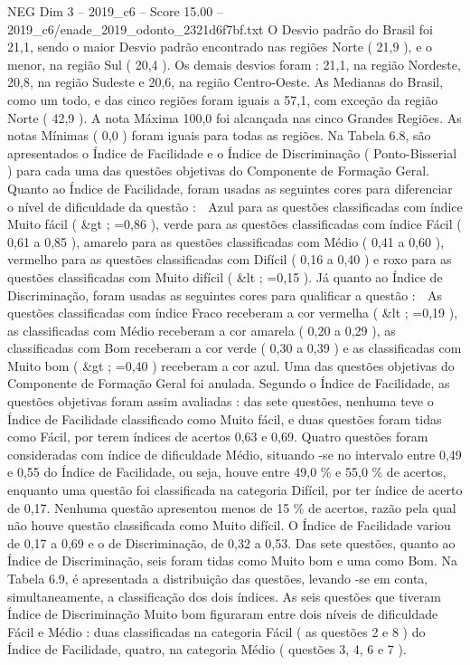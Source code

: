 \begin{textsample}{NEG Dim 3 – 2019\_c6 – Score 15.00 – 2019\_c6/enade\_2019\_odonto\_2321d6f7bf.txt}
O Desvio padrão do Brasil foi 21,1, sendo o maior Desvio padrão encontrado nas regiões Norte ( 21,9 ), e o menor, na região Sul ( 20,4 ).
Os demais desvios foram : 21,1, na região Nordeste, 20,8, na região Sudeste e 20,6, na região Centro-Oeste.
As Medianas do Brasil, como um todo, e das cinco regiões foram iguais a 57,1, com exceção da região Norte ( 42,9 ).
A nota Máxima 100,0 foi alcançada nas cinco Grandes Regiões.
As notas Mínimas ( 0,0 ) foram iguais para todas as regiões.
Na Tabela 6.8, são apresentados o Índice de Facilidade e o Índice de Discriminação ( Ponto-Bisserial ) para cada uma das questões objetivas do Componente de Formação Geral.
Quanto ao Índice de Facilidade, foram usadas as seguintes cores para diferenciar o nível de dificuldade da questão :  Azul para as questões classificadas com índice Muito fácil ( \&gt ; =0,86 ), verde para as questões classificadas com índice Fácil ( 0,61 a 0,85 ), amarelo para as questões classificadas com Médio ( 0,41 a 0,60 ), vermelho para as questões classificadas com Difícil ( 0,16 a 0,40 ) e roxo para as questões classificadas com Muito difícil ( \&lt ; =0,15 ).
Já quanto ao Índice de Discriminação, foram usadas as seguintes cores para qualificar a questão :  As questões classificadas com índice Fraco receberam a cor vermelha ( \&lt ; =0,19 ), as classificadas com Médio receberam a cor amarela ( 0,20 a 0,29 ), as classificadas com Bom receberam a cor verde ( 0,30 a 0,39 ) e as classificadas com Muito bom ( \&gt ; =0,40 ) receberam a cor azul.
Uma das questões objetivas do Componente de Formação Geral foi anulada.
Segundo o Índice de Facilidade, as questões objetivas foram assim avaliadas : das sete questões, nenhuma teve o Índice de Facilidade classificado como Muito fácil, e duas questões foram tidas como Fácil, por terem índices de acertos 0,63 e 0,69.
Quatro questões foram consideradas com índice de dificuldade Médio, situando -se no intervalo entre 0,49 e 0,55 do Índice de Facilidade, ou seja, houve entre 49,0 \% e 55,0 \% de acertos, enquanto uma questão foi classificada na categoria Difícil, por ter índice de acerto de 0,17.
Nenhuma questão apresentou menos de 15 \% de acertos, razão pela qual não houve questão classificada como Muito difícil.
O Índice de Facilidade variou de 0,17 a 0,69 e o de Discriminação, de 0,32 a 0,53.
Das sete questões, quanto ao Índice de Discriminação, seis foram tidas como Muito bom e uma como Bom.
Na Tabela 6.9, é apresentada a distribuição das questões, levando -se em conta, simultaneamente, a classificação dos dois índices.
As seis questões que tiveram Índice de Discriminação Muito bom figuraram entre dois níveis de dificuldade Fácil e Médio : duas classificadas na categoria Fácil ( as questões 2 e 8 ) do Índice de Facilidade, quatro, na categoria Médio ( questões 3, 4, 6 e 7 ).

\end{textsample}
